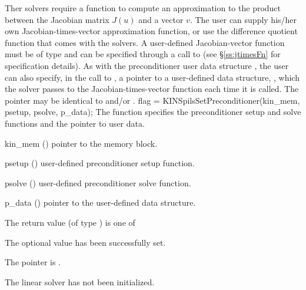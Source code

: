 Ther {\kinspils} solvers require a function to compute an approximation to the
product between the Jacobian matrix $J(u)$ and a vector $v$.
The user can supply his/her own Jacobian-times-vector approximation function, 
or use the difference quotient function  
that comes with the {\kinspils} solvers.  A user-defined Jacobian-vector
function must be of type  and 
can be specified through a call to  
(see \S\ref{ss:jtimesFn} for specification details).
As with the preconditioner user data structure , 
the user can also specify, in the call to , a
pointer to a user-defined data structure, , which
the {\kinspils} solver passes to the Jacobian-times-vector function 
each time it is called.  
The pointer  may be identical to  and/or .
{
  flag = KINSpilsSetPreconditioner(kin\_mem, psetup, psolve, p\_data);
}
{
  The function  specifies the preconditioner
  setup and solve functions and the pointer to user data.
}
{
  \begin{args}
  \item[kin\_mem] ()
    pointer to the {\kinsol} memory block.
  \item[psetup] ()
    user-defined preconditioner setup function.
  \item[psolve] ()
    user-defined preconditioner solve function.
  \item[p\_data] ()
     pointer to the user-defined data structure.
  \end{args}
}
{
  The return value  (of type ) is one of
  \begin{args}
  \item[\Id{KINSPILS\_SUCCESS}] 
    The optional value has been successfully set.
  \item[\Id{KINSPILS\_MEM\_NULL}]
    The  pointer is .
  \item[\Id{KINSPILS\_LMEM\_NULL}]
    The {\kinspils} linear solver has not been initialized.
  \end{args}
}
